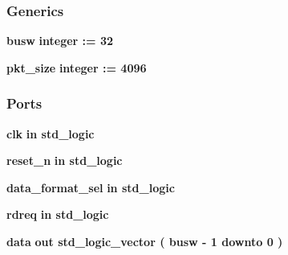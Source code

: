 \subsubsection*{Generics}
 \begin{DoxyCompactItemize}
\item 
{\bf busw} {\bfseries {\bfseries \textcolor{comment}{integer}\textcolor{vhdlchar}{ }\textcolor{vhdlchar}{ }\textcolor{vhdlchar}{\+:}\textcolor{vhdlchar}{=}\textcolor{vhdlchar}{ }\textcolor{vhdlchar}{ } \textcolor{vhdldigit}{32} \textcolor{vhdlchar}{ }}}
\item 
{\bf pkt\+\_\+size} {\bfseries {\bfseries \textcolor{comment}{integer}\textcolor{vhdlchar}{ }\textcolor{vhdlchar}{ }\textcolor{vhdlchar}{\+:}\textcolor{vhdlchar}{=}\textcolor{vhdlchar}{ }\textcolor{vhdlchar}{ } \textcolor{vhdldigit}{4096} \textcolor{vhdlchar}{ }}}
\end{DoxyCompactItemize}
\subsubsection*{Ports}
 \begin{DoxyCompactItemize}
\item 
{\bf clk}  {\bfseries {\bfseries \textcolor{keywordflow}{in}\textcolor{vhdlchar}{ }}} {\bfseries \textcolor{comment}{std\+\_\+logic}\textcolor{vhdlchar}{ }} 
\item 
{\bf reset\+\_\+n}  {\bfseries {\bfseries \textcolor{keywordflow}{in}\textcolor{vhdlchar}{ }}} {\bfseries \textcolor{comment}{std\+\_\+logic}\textcolor{vhdlchar}{ }} 
\item 
{\bf data\+\_\+format\+\_\+sel}  {\bfseries {\bfseries \textcolor{keywordflow}{in}\textcolor{vhdlchar}{ }}} {\bfseries \textcolor{comment}{std\+\_\+logic}\textcolor{vhdlchar}{ }} 
\item 
{\bf rdreq}  {\bfseries {\bfseries \textcolor{keywordflow}{in}\textcolor{vhdlchar}{ }}} {\bfseries \textcolor{comment}{std\+\_\+logic}\textcolor{vhdlchar}{ }} 
\item 
{\bf data}  {\bfseries {\bfseries \textcolor{keywordflow}{out}\textcolor{vhdlchar}{ }}} {\bfseries \textcolor{comment}{std\+\_\+logic\+\_\+vector}\textcolor{vhdlchar}{ }\textcolor{vhdlchar}{(}\textcolor{vhdlchar}{ }\textcolor{vhdlchar}{ }\textcolor{vhdlchar}{ }\textcolor{vhdlchar}{ }{\bfseries {\bf busw}} \textcolor{vhdlchar}{-\/}\textcolor{vhdlchar}{ } \textcolor{vhdldigit}{1} \textcolor{vhdlchar}{ }\textcolor{keywordflow}{downto}\textcolor{vhdlchar}{ }\textcolor{vhdlchar}{ } \textcolor{vhdldigit}{0} \textcolor{vhdlchar}{ }\textcolor{vhdlchar}{)}\textcolor{vhdlchar}{ }} 
\end{DoxyCompactItemize}


